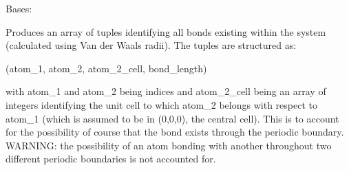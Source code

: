 \documentclass[letterpaper,10pt,english]{sphinxmanual}
\begin{document}
\begin{fulllineitems}
\label{doctree/soprano.properties.linkage.linkage:soprano.properties.linkage.linkage.Bonds}
Bases: {\hyperref[doctree/soprano.properties.atomsproperty:soprano.properties.atomsproperty.AtomsProperty]{}}

Produces an array of tuples identifying all bonds existing within the
system (calculated using Van der Waals radii). The tuples are structured
as:

(atom\_1, atom\_2, atom\_2\_cell, bond\_length)

with atom\_1 and atom\_2 being indices and atom\_2\_cell being an array of
integers identifying the unit cell to which atom\_2 belongs with respect
to atom\_1 (which is assumed to be in (0,0,0), the central cell). This is
to account for the possibility of course that the bond exists through the
periodic boundary. WARNING: the possibility of an atom bonding with
another throughout two different periodic boundaries is not accounted for.


\end{fulllineitems}
\end{document}
